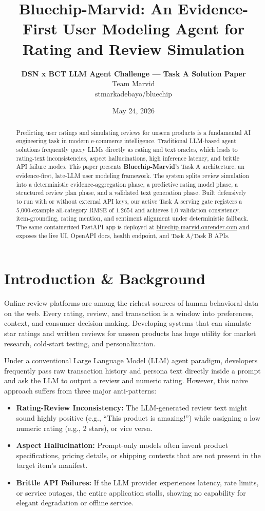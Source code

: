 \documentclass[11pt,a4paper]{article}
\title{\textbf{Bluechip-Marvid: An Evidence-First User Modeling Agent for Rating and Review Simulation}}
\author{\textbf{DSN x BCT LLM Agent Challenge — Task A Solution Paper} \\
Team Marvid \\
stmarkadebayo/bluechip}
\date{May 24, 2026}
\begin{document}
\maketitle

\begin{abstract}
Predicting user ratings and simulating reviews for unseen products is a fundamental AI engineering task in modern e-commerce intelligence. Traditional LLM-based agent solutions frequently query LLMs directly as rating and text oracles, which leads to rating-text inconsistencies, aspect hallucinations, high inference latency, and brittle API failure modes. This paper presents \textbf{Bluechip-Marvid}'s Task A architecture: an evidence-first, late-LLM user modeling framework. The system splits review simulation into a deterministic evidence-aggregation phase, a predictive rating model phase, a structured review plan phase, and a validated text generation phase. Built defensively to run with or without external API keys, our active Task A serving gate registers a 5,000-example all-category RMSE of $1.2654$ and achieves $1.0$ validation consistency, item-grounding, rating mention, and sentiment alignment under deterministic fallback. The same containerized FastAPI app is deployed at \href{https://bluechip-marvid.onrender.com}{bluechip-marvid.onrender.com} and exposes the live UI, OpenAPI docs, health endpoint, and Task A/Task B APIs.
\end{abstract}

\section{Introduction \& Background}
Online review platforms are among the richest sources of human behavioral data on the web. Every rating, review, and transaction is a window into preferences, context, and consumer decision-making. Developing systems that can simulate star ratings and written reviews for unseen products has huge utility for market research, cold-start testing, and personalization.

Under a conventional Large Language Model (LLM) agent paradigm, developers frequently pass raw transaction history and persona text directly inside a prompt and ask the LLM to output a review and numeric rating. However, this naive approach suffers from three major anti-patterns:
\begin{itemize}
    \item \textbf{Rating-Review Inconsistency:} The LLM-generated review text might sound highly positive (e.g., ``This product is amazing!'') while assigning a low numeric rating (e.g., 2 stars), or vice versa.
    \item \textbf{Aspect Hallucination:} Prompt-only models often invent product specifications, pricing details, or shipping contexts that are not present in the target item's manifest.
    \item \textbf{Brittle API Failures:} If the LLM provider experiences latency, rate limits, or service outages, the entire application stalls, showing no capability for elegant degradation or offline service.
\end{itemize}
\end{document}
